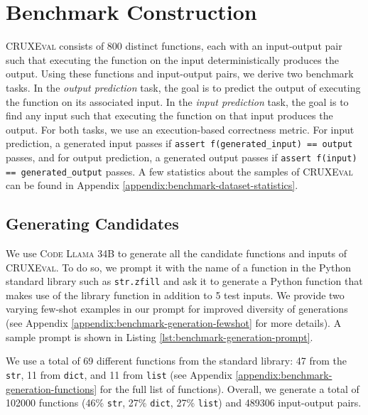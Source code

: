 \documentclass{article} %
\newcommand{\benchmark}{\textsc{CRUXEval}\xspace}
\newcommand{\codellamalarge}{\textsc{Code Llama 34B}\xspace}
\begin{document}

\section{Benchmark Construction} \label{sec:benchmark-construction}

\benchmark consists of 800 distinct functions, each with an input-output pair such that executing the function on the input deterministically produces the output. Using these functions and input-output pairs, we derive two benchmark tasks. In the \textit{output prediction} task, the goal is to predict the output of executing the function on its associated input. In the \textit{input prediction} task, the goal is to find any input such that executing the function on that input produces the output. For both tasks, we use an execution-based correctness metric. For input prediction, a generated input passes if \texttt{assert f(generated\_input) == output} passes, and for output prediction, a generated output passes if \texttt{assert f(input) == generated\_output} passes. A few statistics about the samples of \benchmark can be found in Appendix \ref{appendix:benchmark-dataset-statistics}.

\subsection{Generating Candidates} \label{subsec:generating-candidates}
We use \codellamalarge to generate all the candidate functions and inputs of \benchmark. To do so, we prompt it with the name of a function in the Python standard library such as \texttt{str.zfill} and ask it to generate a Python function that makes use of the library function in addition to 5 test inputs. We provide two varying few-shot examples in our prompt for improved diversity of generations (see Appendix \ref{appendix:benchmark-generation-fewshot} for more details). A sample prompt is shown in Listing \ref{lst:benchmark-generation-prompt}.

We use a total of 69 different functions from the standard library: 47 from the \texttt{str}, 11 from \texttt{dict}, and 11 from \texttt{list} (see Appendix \ref{appendix:benchmark-generation-functions} for the full list of functions). Overall, we generate a total of 102000 functions (46\% \texttt{str}, 27\% \texttt{dict}, 27\% \texttt{list}) and 489306 input-output pairs.

\end{document}
